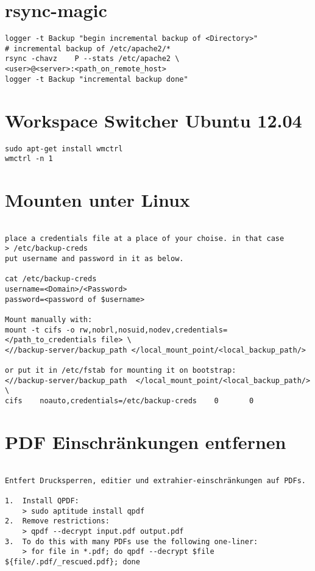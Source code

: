 \documentclass[a4paper,10pt]{report}
\begin{document}
\section{rsync-magic}
\begin{verbatim}
logger -t Backup "begin incremental backup of <Directory>"
# incremental backup of /etc/apache2/*
rsync -chavz	P --stats /etc/apache2 \
<user>@<server>:<path_on_remote_host>
logger -t Backup "incremental backup done"
\end{verbatim}
\pagebreak

\section{Workspace Switcher Ubuntu 12.04 }
\begin{verbatim}
sudo apt-get install wmctrl
wmctrl -n 1
\end{verbatim}


\section{Mounten unter Linux}
\begin{verbatim}

place a credentials file at a place of your choise. in that case 
> /etc/backup-creds
put username and password in it as below.

cat /etc/backup-creds
username=<Domain>/<Password>
password=<password of $username>

Mount manually with:
mount -t cifs -o rw,nobrl,nosuid,nodev,credentials=</path_to_credentials file> \
<//backup-server/backup_path </local_mount_point/<local_backup_path/>

or put it in /etc/fstab for mounting it on bootstrap:
<//backup-server/backup_path  </local_mount_point/<local_backup_path/>  \
cifs    noauto,credentials=/etc/backup-creds    0       0
\end{verbatim}

\section{PDF Einschränkungen entfernen}
\begin{verbatim}

Entfert Drucksperren, editier und extrahier-einschränkungen auf PDFs.

1.  Install QPDF:
    > sudo aptitude install qpdf
2.  Remove restrictions:
    > qpdf --decrypt input.pdf output.pdf
3.  To do this with many PDFs use the following one-liner:
    > for file in *.pdf; do qpdf --decrypt $file ${file/.pdf/_rescued.pdf}; done

\end{verbatim}
\end{document}

